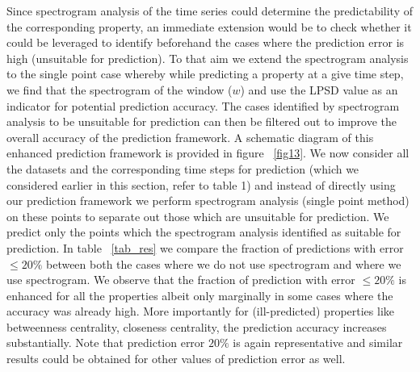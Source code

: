 Since spectrogram analysis of the time series could determine the predictability of the corresponding property, 
an immediate extension would be to check whether it could be leveraged to identify beforehand the cases where the prediction error is high (unsuitable for prediction). 
To that aim we extend the spectrogram analysis to the single point case whereby  
 while predicting a property at a give time step, we find that the spectrogram of the window ($w$) and use the LPSD value as an indicator for potential prediction accuracy. 
 The cases identified by spectrogram analysis to be unsuitable for prediction can then be filtered out to improve the overall accuracy of the prediction framework. 
  A schematic diagram of this enhanced prediction framework is 
 provided in figure ~\ref{fig13}.
We now consider all the datasets and the corresponding time steps for prediction (which we considered earlier in this section, refer to table 1) and  
instead of directly using our prediction framework we 
 perform spectrogram analysis (single point method) on these points to separate out those which are unsuitable for prediction. We predict 
 only the points which the spectrogram analysis identified as suitable for prediction.
 In table ~\ref{tab_res} we compare the fraction of predictions with 
 error $\leq 20\%$ between both the cases where we do not use spectrogram  and where we use spectrogram. 
 We observe that the fraction of prediction with error $\leq 20\%$ is enhanced for all the properties albeit only marginally in some cases where the accuracy was already high. 
 More importantly for (ill-predicted) properties like betweenness centrality, closeness centrality, the prediction
accuracy increases substantially. 
 Note that prediction error $20\%$ is again representative and similar results 
 could be obtained for other values of prediction error as well.

